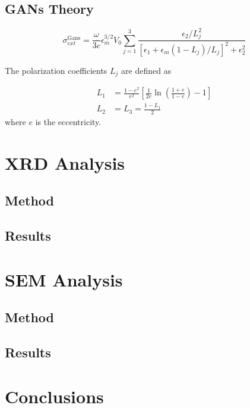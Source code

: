 \documentclass[twocolumn]{article}
\begin{document}
\begin{multicols}{2}
\subsection{GANs Theory}

\begin{equation*}
\sigma_{ext}^{\text{Gans}} = \frac{\omega}{3c} \epsilon_m^{3/2}V_{0} \sum^{3}_{j=1}{\frac{\epsilon_2/L_j^2}{[\epsilon_1 + \epsilon_m(1-L_j)/L_j]^2 + \epsilon_2^2}}
\end{equation*}

The polarization coefficients $L_j$ are defined as 

\begin{subequations}
\begin{align}
  L_1 &= \frac{1-e^2}{e^2} \left[\frac{1}{2e}\ln{\left(\frac{1+e}{1-e}\right)}-1\right] \\
  L_2 &= L_3 = \frac{1-L_1}{2} 
\end{align}
\end{subequations}
where $e$ is the eccentricity.

\section{XRD Analysis}
\label{sec:XRD}

\subsection{Method}

\subsection{Results}

\section{SEM Analysis}
\label{sec:SEM}

\subsection{Method}

\subsection{Results}

\section{Conclusions}

\clearpage
\printbibliography

\end{multicols}
\end{document}
